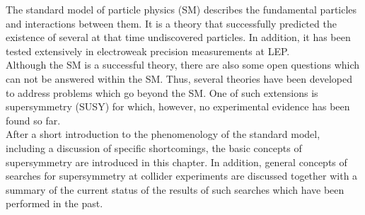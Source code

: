 The standard model of particle physics (SM) describes the fundamental particles and interactions between them. It is a theory that successfully predicted the existence of several at that time undiscovered particles. In addition, it has been tested extensively in electroweak precision measurements at LEP. \\
Although the SM is a successful theory, there are also some open questions which can not be answered within the SM. Thus, several theories have been developed to address problems which go beyond the SM. One of such extensions is supersymmetry (SUSY) for which, however, no experimental evidence has been found so far. \\
After a short introduction to the phenomenology of the standard model, including a discussion of specific shortcomings, the basic concepts of supersymmetry are introduced in this chapter. In addition, general concepts of searches for supersymmetry at collider experiments are discussed together with a summary of the current status of the results of such searches which have been performed in the past.
